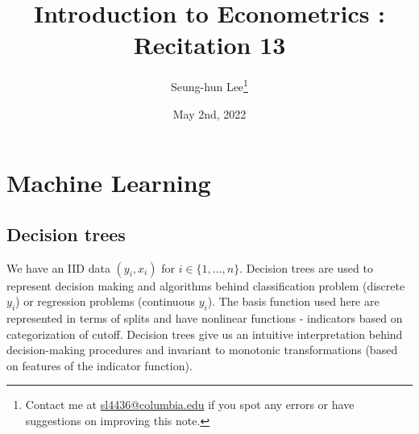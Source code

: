 \documentclass[12pt]{article}
\title{Introduction to Econometrics \ROM{2}: Recitation 13}
\theoremstyle{definition}
\theoremstyle{property}
\theoremstyle{assumption}
\theoremstyle{example}
\theoremstyle{comment}
\begin{document}
\linespread{1.25}
\onehalfspacing

\author{Seung-hun Lee\footnote{Contact me at \href{mailto:sl4436@columbia.edu}{sl4436@columbia.edu} if you spot any errors or have suggestions on improving this note.}}
\date{May 2nd, 2022}
\maketitle
\thispagestyle{firstpage}


\section{Machine Learning}
\subsection{Decision trees}
We have an IID data $(y_i,x_i)$ for $i\in\{1,...,n\}$. Decision trees are used to represent decision making and algorithms behind classification problem (discrete $y_i$) or regression problems (continuous $y_i$). The basis function used here are represented in terms of splits and have nonlinear functions - indicators based on categorization of cutoff. Decision trees give us an intuitive interpretation behind decision-making procedures and invariant to monotonic transformations (based on features of the indicator function). 
\end{document}
